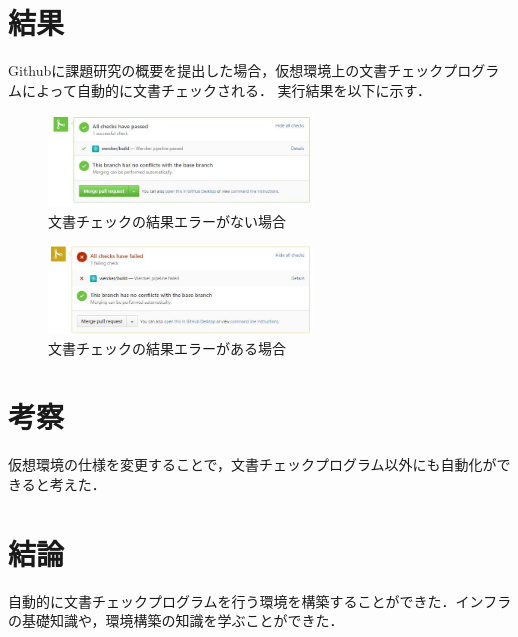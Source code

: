 \documentclass[uplatex,twocolumn,dvipdfmx]{jsarticle}
\begin{document}
\section{結果}
Githubに課題研究の概要を提出した場合，仮想環境上の文書チェックプログラムによって自動的に文書チェックされる．
\noindent
実行結果を以下に示す．
\noindent
\begin{figure}[h]
\centering
\includegraphics[width=7cm,clip]{3.JPG}
\caption{文書チェックの結果エラーがない場合}\label{}
\end{figure}
\begin{figure}[h]
\centering
\includegraphics[width=7cm,clip]{2.JPG}
\caption{文書チェックの結果エラーがある場合}\label{}
\end{figure}

\section{考察}
仮想環境の仕様を変更することで，文書チェックプログラム以外にも自動化ができると考えた．


\section{結論}
自動的に文書チェックプログラムを行う環境を構築することができた．インフラの基礎知識や，環境構築の知識を学ぶことができた．






\end{document}

